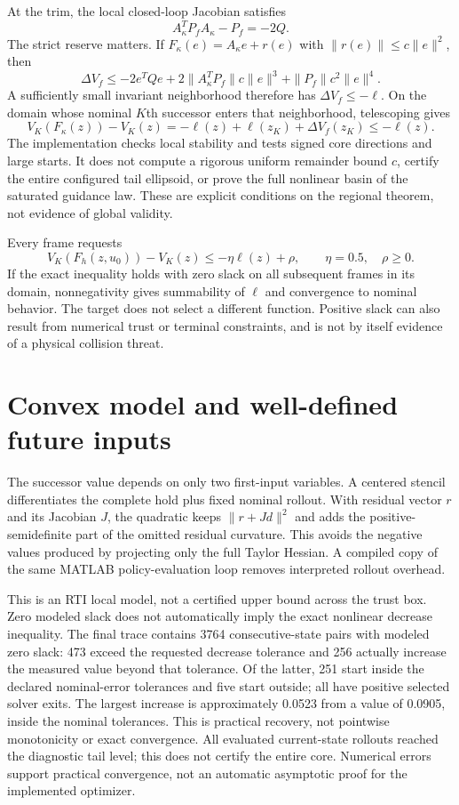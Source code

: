 \documentclass[11pt]{article}
\begin{document}
At the trim, the local closed-loop Jacobian satisfies
\[
 A_\kappa^TP_fA_\kappa-P_f=-2Q.
\]
The strict reserve matters. If $F_\kappa(e)=A_\kappa e+r(e)$ with
$\|r(e)\|\le c\|e\|^2$, then
\[
 \Delta V_f\le-2e^TQe+
 2\|A_\kappa^TP_f\|c\|e\|^3+\|P_f\|c^2\|e\|^4.
\]
A sufficiently small invariant neighborhood therefore has
$\Delta V_f\le-\ell$. On the domain whose nominal $K$th successor enters
that neighborhood, telescoping gives
\[
 V_K(F_\kappa(z))-V_K(z)
 =-\ell(z)+\ell(z_K)+\Delta V_f(z_K)\le-\ell(z).
\]
The implementation checks local stability and tests signed core directions
and large starts. It does not compute a rigorous uniform remainder bound
$c$, certify the entire configured tail ellipsoid, or prove the full
nonlinear basin of the saturated guidance law. These are explicit conditions
on the regional theorem, not evidence of global validity.

Every frame requests
\[
 V_K(F_h(z,u_0))-V_K(z)\le-\eta\ell(z)+\rho,
 \qquad \eta=0.5,\quad \rho\ge0.
\]
If the exact inequality holds with zero slack on all subsequent frames in
its domain, nonnegativity gives summability of $\ell$ and convergence to
nominal behavior. The target does not select a different function. Positive
slack can also result from numerical trust or terminal constraints, and is
not by itself evidence of a physical collision threat.

\section{Convex model and well-defined future inputs}
The successor value depends on only two first-input variables. A centered
stencil differentiates the complete hold plus fixed nominal rollout. With
residual vector $r$ and its Jacobian $J$, the quadratic keeps
$\|r+Jd\|^2$ and adds the positive-semidefinite part of the omitted residual
curvature. This avoids the negative values produced by projecting only the
full Taylor Hessian. A compiled copy of the same MATLAB policy-evaluation
loop removes interpreted rollout overhead.

This is an RTI local model, not a certified upper bound across the trust box.
Zero modeled slack does not automatically imply the exact nonlinear decrease
inequality. The final trace contains 3764 consecutive-state pairs with
modeled zero slack: 473 exceed the requested decrease tolerance and
256 actually increase the measured value beyond that tolerance.
Of the latter, 251 start inside the declared nominal-error tolerances and five
start outside; all have positive selected solver exits. The largest increase
is approximately 0.0523 from a value of 0.0905, inside the nominal tolerances.
This is practical recovery, not pointwise monotonicity or exact convergence.
All evaluated current-state rollouts reached the diagnostic tail level;
this does not certify the entire core. Numerical errors support practical
convergence, not an automatic asymptotic proof for the implemented optimizer.
\end{document}
